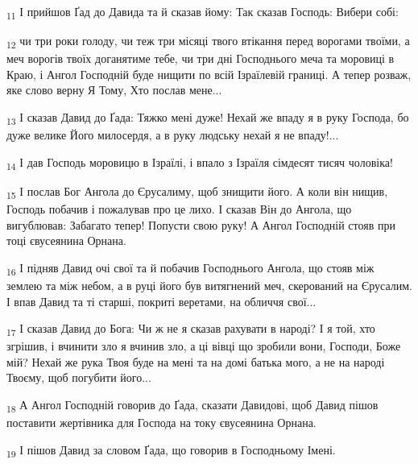 \begin{tcolorbox}
\textsubscript{11} І прийшов Ґад до Давида та й сказав йому: Так сказав Господь: Вибери собі:
\end{tcolorbox}
\begin{tcolorbox}
\textsubscript{12} чи три роки голоду, чи теж три місяці твого втікання перед ворогами твоїми, а меч ворогів твоїх доганятиме тебе, чи три дні Господнього меча та моровиці в Краю, і Ангол Господній буде нищити по всій Ізраїлевій границі. А тепер розваж, яке слово верну Я Тому, Хто послав мене...
\end{tcolorbox}
\begin{tcolorbox}
\textsubscript{13} І сказав Давид до Ґада: Тяжко мені дуже! Нехай же впаду я в руку Господа, бо дуже велике Його милосердя, а в руку людську нехай я не впаду!...
\end{tcolorbox}
\begin{tcolorbox}
\textsubscript{14} І дав Господь моровицю в Ізраїлі, і впало з Ізраїля сімдесят тисяч чоловіка!
\end{tcolorbox}
\begin{tcolorbox}
\textsubscript{15} І послав Бог Ангола до Єрусалиму, щоб знищити його. А коли він нищив, Господь побачив і пожалував про це лихо. І сказав Він до Ангола, що вигублював: Забагато тепер! Попусти свою руку! А Ангол Господній стояв при тоці євусеянина Орнана.
\end{tcolorbox}
\begin{tcolorbox}
\textsubscript{16} І підняв Давид очі свої та й побачив Господнього Ангола, що стояв між землею та між небом, а в руці його був витягнений меч, скерований на Єрусалим. І впав Давид та ті старші, покриті веретами, на обличчя свої...
\end{tcolorbox}
\begin{tcolorbox}
\textsubscript{17} І сказав Давид до Бога: Чи ж не я сказав рахувати в народі? І я той, хто згрішив, і вчинити зло я вчинив зло, а ці вівці що зробили вони, Господи, Боже мій? Нехай же рука Твоя буде на мені та на домі батька мого, а не на народі Твоєму, щоб погубити його...
\end{tcolorbox}
\begin{tcolorbox}
\textsubscript{18} А Ангол Господній говорив до Ґада, сказати Давидові, щоб Давид пішов поставити жертівника для Господа на току євусеянина Орнана.
\end{tcolorbox}
\begin{tcolorbox}
\textsubscript{19} І пішов Давид за словом Ґада, що говорив в Господньому Імені.
\end{tcolorbox}
